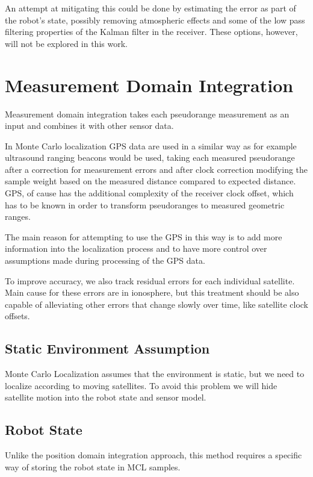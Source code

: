 An attempt at mitigating this could be done by estimating the error as part of
the robot's state, possibly removing atmospheric effects and some of the low pass
filtering properties of the Kalman filter in the receiver.
These options, however, will not be explored in this work.

\section{Measurement Domain Integration}
\label{sec:measurement-domain}

Measurement domain integration takes each pseudorange measurement as an input
and combines it with other sensor data.

In Monte Carlo localization GPS data are used in a similar way as
for example ultrasound ranging beacons would be used,
taking each measured pseudorange after a correction for measurement errors
and after clock correction modifying the sample weight based on the measured distance
compared to expected distance.
GPS, of cause has the additional complexity of the receiver clock offset, which
has to be known in order to transform pseudoranges to measured geometric ranges.

The main reason for attempting to use the GPS in this way is to add more information
into the localization process and to have more control over assumptions made during
processing of the GPS data.

To improve accuracy, we also track residual errors for each individual satellite.
Main cause for these errors are in ionosphere, but this treatment should be also
capable of alleviating other errors that change slowly over time, like satellite
clock offsets.

\subsection{Static Environment Assumption}
\label{sec:gps-mcl-static-env}
Monte Carlo Localization assumes that the environment is static, but we need to
localize according to moving satellites.
To avoid this problem we will hide satellite motion into the robot state and sensor model.

\subsection{Robot State}
Unlike the position domain integration approach, this method requires
a specific way of storing the robot state in MCL samples.

